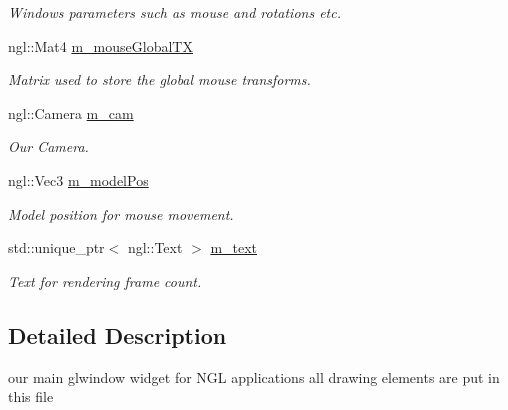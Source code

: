 \begin{DoxyCompactItemize}
\begin{DoxyCompactList}\small\item\em Window\textquotesingle{}s parameters such as mouse and rotations etc. \end{DoxyCompactList}\item 
ngl\+::\+Mat4 \hyperlink{class_n_g_l_scene_a205162fdc65f45b4a4d956fdc60e8a4d}{m\+\_\+mouse\+Global\+TX}\hypertarget{class_n_g_l_scene_a205162fdc65f45b4a4d956fdc60e8a4d}{}\label{class_n_g_l_scene_a205162fdc65f45b4a4d956fdc60e8a4d}

\begin{DoxyCompactList}\small\item\em Matrix used to store the global mouse transforms. \end{DoxyCompactList}\item 
ngl\+::\+Camera \hyperlink{class_n_g_l_scene_a4faea2adadeaad479ff774e8345815e6}{m\+\_\+cam}\hypertarget{class_n_g_l_scene_a4faea2adadeaad479ff774e8345815e6}{}\label{class_n_g_l_scene_a4faea2adadeaad479ff774e8345815e6}

\begin{DoxyCompactList}\small\item\em Our Camera. \end{DoxyCompactList}\item 
ngl\+::\+Vec3 \hyperlink{class_n_g_l_scene_aafe232ffe5c4f03ea3095665d91c2ab3}{m\+\_\+model\+Pos}\hypertarget{class_n_g_l_scene_aafe232ffe5c4f03ea3095665d91c2ab3}{}\label{class_n_g_l_scene_aafe232ffe5c4f03ea3095665d91c2ab3}

\begin{DoxyCompactList}\small\item\em Model position for mouse movement. \end{DoxyCompactList}\item 
std\+::unique\+\_\+ptr$<$ ngl\+::\+Text $>$ \hyperlink{class_n_g_l_scene_a05b5509f8030ebfbf50714307850b9c9}{m\+\_\+text}\hypertarget{class_n_g_l_scene_a05b5509f8030ebfbf50714307850b9c9}{}\label{class_n_g_l_scene_a05b5509f8030ebfbf50714307850b9c9}

\begin{DoxyCompactList}\small\item\em Text for rendering frame count. \end{DoxyCompactList}\end{DoxyCompactItemize}


\subsection{Detailed Description}
our main glwindow widget for N\+GL applications all drawing elements are put in this file 

